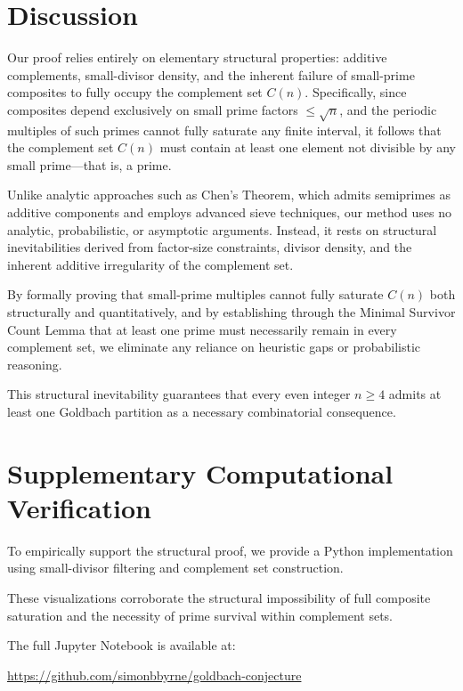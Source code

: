 \documentclass[11pt]{article}
\begin{document}
	\section{Discussion}
	
	Our proof relies entirely on elementary structural properties: additive complements, small-divisor density, and the inherent failure of small-prime composites to fully occupy the complement set \( C(n) \). Specifically, since composites depend exclusively on small prime factors \( \leq \sqrt{n} \), and the periodic multiples of such primes cannot fully saturate any finite interval, it follows that the complement set \( C(n) \) must contain at least one element not divisible by any small prime—that is, a prime.
	
	Unlike analytic approaches such as Chen's Theorem, which admits semiprimes as additive components and employs advanced sieve techniques, our method uses no analytic, probabilistic, or asymptotic arguments. Instead, it rests on structural inevitabilities derived from factor-size constraints, divisor density, and the inherent additive irregularity of the complement set.
	
	By formally proving that small-prime multiples cannot fully saturate \( C(n) \) both structurally and quantitatively, and by establishing through the Minimal Survivor Count Lemma that at least one prime must necessarily remain in every complement set, we eliminate any reliance on heuristic gaps or probabilistic reasoning.
	
	This structural inevitability guarantees that every even integer \( n \geq 4 \) admits at least one Goldbach partition as a necessary combinatorial consequence.

	

	\section*{Supplementary Computational Verification}
	
	To empirically support the structural proof, we provide a Python implementation using small-divisor filtering and complement set construction.
	
	These visualizations corroborate the structural impossibility of full composite saturation and the necessity of prime survival within complement sets.
	
	The full Jupyter Notebook is available at:
	
	\url{https://github.com/simonbbyrne/goldbach-conjecture}
	
\end{document}
